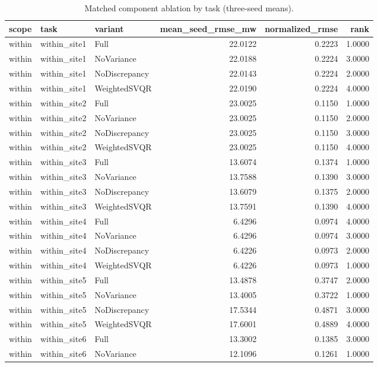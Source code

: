 \begin{table}
\caption{Matched component ablation by task (three-seed means).}
\label{tab:matched_ablation_task}
\begin{tabular}{lllrrr}
\toprule
scope & task & variant & mean\_seed\_rmse\_mw & normalized\_rmse & rank \\
\midrule
within & within\_site1 & Full & 22.0122 & 0.2223 & 1.0000 \\
within & within\_site1 & NoVariance & 22.0188 & 0.2224 & 3.0000 \\
within & within\_site1 & NoDiscrepancy & 22.0143 & 0.2224 & 2.0000 \\
within & within\_site1 & WeightedSVQR & 22.0190 & 0.2224 & 4.0000 \\
within & within\_site2 & Full & 23.0025 & 0.1150 & 1.0000 \\
within & within\_site2 & NoVariance & 23.0025 & 0.1150 & 2.0000 \\
within & within\_site2 & NoDiscrepancy & 23.0025 & 0.1150 & 3.0000 \\
within & within\_site2 & WeightedSVQR & 23.0025 & 0.1150 & 4.0000 \\
within & within\_site3 & Full & 13.6074 & 0.1374 & 1.0000 \\
within & within\_site3 & NoVariance & 13.7588 & 0.1390 & 3.0000 \\
within & within\_site3 & NoDiscrepancy & 13.6079 & 0.1375 & 2.0000 \\
within & within\_site3 & WeightedSVQR & 13.7591 & 0.1390 & 4.0000 \\
within & within\_site4 & Full & 6.4296 & 0.0974 & 4.0000 \\
within & within\_site4 & NoVariance & 6.4296 & 0.0974 & 3.0000 \\
within & within\_site4 & NoDiscrepancy & 6.4226 & 0.0973 & 2.0000 \\
within & within\_site4 & WeightedSVQR & 6.4226 & 0.0973 & 1.0000 \\
within & within\_site5 & Full & 13.4878 & 0.3747 & 2.0000 \\
within & within\_site5 & NoVariance & 13.4005 & 0.3722 & 1.0000 \\
within & within\_site5 & NoDiscrepancy & 17.5344 & 0.4871 & 3.0000 \\
within & within\_site5 & WeightedSVQR & 17.6001 & 0.4889 & 4.0000 \\
within & within\_site6 & Full & 13.3002 & 0.1385 & 3.0000 \\
within & within\_site6 & NoVariance & 12.1096 & 0.1261 & 1.0000 \\

\end{tabular}
\end{table}

